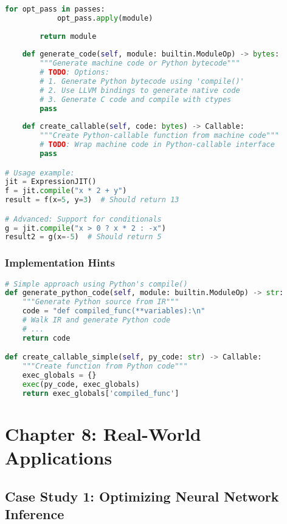 \documentclass[11pt,a4paper]{article}
\begin{document}
\begin{lstlisting}[language=Python, caption=Exercise: JIT Compiler]
        for opt_pass in passes:
            opt_pass.apply(module)
        
        return module
    
    def generate_code(self, module: builtin.ModuleOp) -> bytes:
        """Generate machine code or Python bytecode"""
        # TODO: Options:
        # 1. Generate Python bytecode using 'compile()'
        # 2. Use LLVM bindings to generate native code
        # 3. Generate C code and compile with ctypes
        pass
    
    def create_callable(self, code: bytes) -> Callable:
        """Create Python-callable function from machine code"""
        # TODO: Wrap machine code in Python-callable interface
        pass

# Usage example:
jit = ExpressionJIT()
f = jit.compile("x * 2 + y")
result = f(x=5, y=3)  # Should return 13

# Advanced: Support for conditionals
g = jit.compile("x > 0 ? x * 2 : -x")
result2 = g(x=-5)  # Should return 5
\end{lstlisting}

\subsubsection{Implementation Hints}

\begin{lstlisting}[language=Python, caption=JIT Implementation Starter Code]
# Simple approach using Python's compile()
def generate_python_code(self, module: builtin.ModuleOp) -> str:
    """Generate Python source from IR"""
    code = "def compiled_func(**variables):\n"
    # Walk IR and generate Python code
    # ...
    return code

def create_callable_simple(self, py_code: str) -> Callable:
    """Create function from Python code"""
    exec_globals = {}
    exec(py_code, exec_globals)
    return exec_globals['compiled_func']
\end{lstlisting}

\section{Chapter 8: Real-World Applications}

\subsection{Case Study 1: Optimizing Neural Network Inference}
\end{document}
